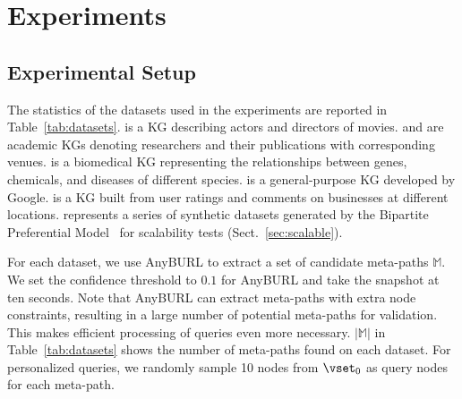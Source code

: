 \section{Experiments}
\label{sec:exp}

\subsection{Experimental Setup}

The statistics of the datasets used in the experiments are reported in Table~\ref{tab:datasets}.
\dsimdb is a KG describing actors and directors of movies.
\dsacm and \dsdblp are academic KGs denoting researchers and their publications with corresponding venues.
\dspubmed is a biomedical KG representing the relationships between genes, chemicals, and diseases of different species.
\dsfreebase is a general-purpose KG developed by Google.
\dsyelp is a KG built from user ratings and comments on businesses at different locations.
\dsbpm represents a series of synthetic datasets generated by the Bipartite Preferential Model~\cite{xirogiannopoulos2017extracting,guillaume2004bipartite,guillaume2006bipartite} for scalability tests (Sect.~\ref{sec:scalable}).



\vspace{1mm}
For each dataset, we use \textsf{AnyBURL} \cite{meilicke2019anytime} to extract a set of candidate meta-paths $\mathbb{M}$.
We set the confidence threshold to $0.1$ for \textsf{AnyBURL} and take the snapshot at ten seconds.
Note that \textsf{AnyBURL} can extract meta-paths with extra node constraints, resulting in a large number of potential meta-paths for validation.
This makes efficient processing of \ced queries even more necessary. $|\mathbb{M}|$ in Table~\ref{tab:datasets} shows the number of meta-paths found on each dataset.
For personalized \ced queries, we randomly sample 10 nodes from $\vset_0$ as query nodes for each meta-path.

